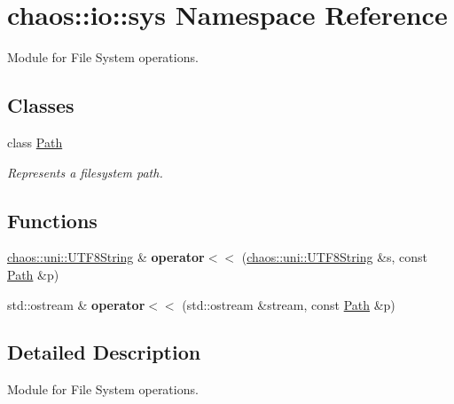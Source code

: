 \hypertarget{namespacechaos_1_1io_1_1sys}{\section{chaos\-:\-:io\-:\-:sys Namespace Reference}
\label{namespacechaos_1_1io_1_1sys}
}


Module for File System operations.  


\subsection*{Classes}
\begin{DoxyCompactItemize}
\item 
class \hyperlink{classchaos_1_1io_1_1sys_1_1_path}{Path}
\begin{DoxyCompactList}\small\item\em Represents a filesystem path. \end{DoxyCompactList}\end{DoxyCompactItemize}
\subsection*{Functions}
\begin{DoxyCompactItemize}
\item 
\hypertarget{namespacechaos_1_1io_1_1sys_a669178b3843d1716570b4b5ca8fd417d}{\hyperlink{classchaos_1_1uni_1_1_u_t_f8_string}{chaos\-::uni\-::\-U\-T\-F8\-String} \& {\bfseries operator$<$$<$} (\hyperlink{classchaos_1_1uni_1_1_u_t_f8_string}{chaos\-::uni\-::\-U\-T\-F8\-String} \&s, const \hyperlink{classchaos_1_1io_1_1sys_1_1_path}{Path} \&p)}\label{namespacechaos_1_1io_1_1sys_a669178b3843d1716570b4b5ca8fd417d}

\item 
\hypertarget{namespacechaos_1_1io_1_1sys_aa28fa69e8966c0ff55c3b59cdff9cebc}{std\-::ostream \& {\bfseries operator$<$$<$} (std\-::ostream \&stream, const \hyperlink{classchaos_1_1io_1_1sys_1_1_path}{Path} \&p)}\label{namespacechaos_1_1io_1_1sys_aa28fa69e8966c0ff55c3b59cdff9cebc}

\end{DoxyCompactItemize}


\subsection{Detailed Description}
Module for File System operations. 